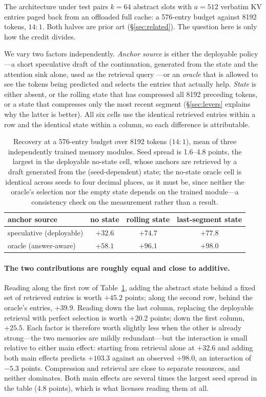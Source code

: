 \documentclass[11pt]{article}
\begin{document}
The architecture under test pairs $k=64$ abstract slots with $a=512$ verbatim KV
entries paged back from an offloaded full cache: a 576-entry budget against 8192
tokens, $14{:}1$. Both halves are prior art (\S\ref{sec:related}). The question
here is only how the credit divides.

We vary two factors independently. \emph{Anchor source} is either the deployable
policy---a short speculative draft of the continuation, generated from the state
and the attention sink alone, used as the retrieval query \citep{specache}---or an
\emph{oracle} that is allowed to see the tokens being predicted and selects the
entries that actually help. \emph{State} is either absent, or the rolling state
that has compressed all 8192 preceding tokens, or a state that compresses only
the most recent segment (\S\ref{sec:levers} explains why the latter is better).
All six cells use the identical retrieved entries within a row and the identical
state within a column, so each difference is attributable.

\begin{table}[ht]
\centering
\begin{tabular}{lccc}
\toprule
anchor source & no state & rolling state & last-segment state \\
\midrule
speculative (deployable) & $+32.6$ & $+74.7$ & $+77.8$ \\
oracle (answer-aware)    & $+58.1$ & $+96.1$ & $\mathbf{+98.0}$ \\
\bottomrule
\end{tabular}
\caption{Recovery at a 576-entry budget over 8192 tokens ($14{:}1$), mean of
three independently trained memory modules. Seed spread is 1.6--4.8 points, the
largest in the deployable no-state cell, whose anchors are retrieved by a draft
generated from the (seed-dependent) state; the no-state oracle cell is identical across seeds to four decimal
places, as it must be, since neither the oracle's selection nor the empty state
depends on the trained module---a consistency check on the measurement rather
than a result.}
\label{tab:twobytwo}
\end{table}

\paragraph{The two contributions are roughly equal and close to additive.}
Reading along the first row of Table~\ref{tab:twobytwo}, adding the abstract state behind a fixed set of
retrieved entries is worth $+45.2$ points; along the second row, behind the
oracle's entries, $+39.9$. Reading down the last column, replacing the deployable
retrieval with perfect selection is worth $+20.2$ points; down the first column,
$+25.5$. Each factor is therefore worth slightly less when the other is already
strong---the two memories are mildly redundant---but the interaction is small
relative to either main effect: starting from retrieval alone at $+32.6$ and
adding both main effects predicts $+103.3$ against an observed $+98.0$, an
interaction of $-5.3$ points. Compression and retrieval are close to separate
resources, and neither dominates. Both main effects are several times the
largest seed spread in the table (4.8 points), which is what licenses reading
them at all.
\end{document}
